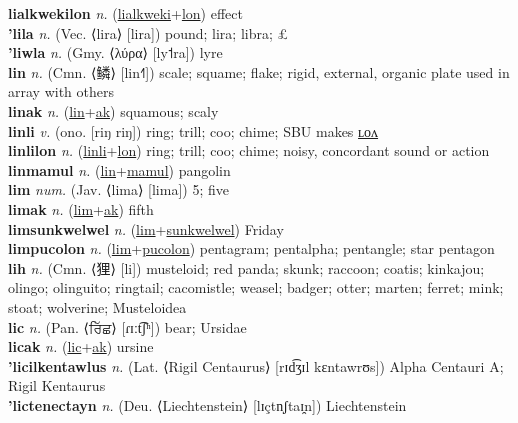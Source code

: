 \textbf{lialkwekilon} \textit{n.} (\hyperref[lialkweki]{lialkweki}+\hyperref[lon]{lon})
effect \label{lialkwekilon} \\
\textbf{'lila} \textit{n.} (Vec. ⟨lira⟩ [lira])
pound; lira; libra; £ \label{'lila} \\
\textbf{'liwla} \textit{n.} (Gmy. ⟨λύρα⟩ [ly˦ra])
lyre \label{'liwla} \\
\textbf{lin} \textit{n.} (Cmn. ⟨鳞⟩ [lin˧˥])
scale; squame; flake; rigid, external, organic plate used in array with others \label{lin} \\
\textbf{linak} \textit{n.} (\hyperref[lin]{lin}+\hyperref[ak]{ak})
squamous; scaly \label{linak} \\
\textbf{linli} \textit{v.} (ono. [riŋ riŋ])
ring; trill; coo; chime; SBU makes \hyperref[linlilon]{ʟᴏᴧ} \label{linli} \\
\textbf{linlilon} \textit{n.} (\hyperref[linli]{linli}+\hyperref[lon]{lon})
ring; trill; coo; chime; noisy, concordant sound or action \label{linlilon} \\
\textbf{linmamul} \textit{n.} (\hyperref[lin]{lin}+\hyperref[mamul]{mamul})
pangolin \label{linmamul} \\
\textbf{lim} \textit{num.} (Jav. ⟨lima⟩ [lima])
5; five \label{lim} \\
\textbf{limak} \textit{n.} (\hyperref[lim]{lim}+\hyperref[ak]{ak})
fifth \label{limak} \\
\textbf{limsunkwelwel} \textit{n.} (\hyperref[lim]{lim}+\hyperref[sunkwelwel]{sunkwelwel})
Friday \label{limsunkwelwel} \\
\textbf{limpucolon} \textit{n.} (\hyperref[lim]{lim}+\hyperref[pucolon]{pucolon})
pentagram; pentalpha; pentangle; star pentagon \label{limpucolon} \\
\textbf{lih} \textit{n.} (Cmn. ⟨狸⟩ [li])
musteloid; red panda; skunk; raccoon; coatis; kinkajou; olingo; olinguito; ringtail; cacomistle; weasel; badger; otter; marten; ferret; mink; stoat; wolverine; Musteloidea \label{lih} \\
\textbf{lic} \textit{n.} (Pan. ⟨ਰਿੱਛ⟩ [ɾɪːt͡ʃʰ])
bear; Ursidae \label{lic} \\
\textbf{licak} \textit{n.} (\hyperref[lic]{lic}+\hyperref[ak]{ak})
ursine \label{licak} \\
\textbf{'licilkentawlus} \textit{n.} (Lat. ⟨Rigil Centaurus⟩ [rɪd͡ʒɪl kɛntawrʊs])
Alpha Centauri A; Rigil Kentaurus \label{'licilkentawlus} \\
\textbf{'lictenectayn} \textit{n.} (Deu. ⟨Liechtenstein⟩ [lɪçtn̩ʃtaɪ̯n])
Liechtenstein \label{'lictenectayn} \\
